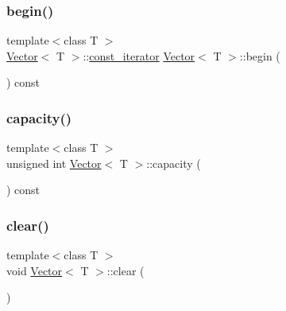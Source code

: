 \mbox{\label{classVector_af8559abeb71f43efc0fc2933b79c3901_af8559abeb71f43efc0fc2933b79c3901}} 
\subsubsection{\texorpdfstring{begin()}{begin()}\hspace{0.1cm}{\footnotesize\ttfamily [2/2]}}
{\footnotesize\ttfamily template$<$class T $>$ \\
\hyperlink{classVector}{Vector}$<$ T $>$\+::\hyperlink{classVector_1_1const__iterator}{const\+\_\+iterator} \hyperlink{classVector}{Vector}$<$ T $>$\+::begin (\begin{DoxyParamCaption}{ }\end{DoxyParamCaption}) const}

\mbox{\label{classVector_a68ecb8dc5e1047cead715396d146ed61_a68ecb8dc5e1047cead715396d146ed61}} 
\subsubsection{\texorpdfstring{capacity()}{capacity()}}
{\footnotesize\ttfamily template$<$class T $>$ \\
unsigned int \hyperlink{classVector}{Vector}$<$ T $>$\+::capacity (\begin{DoxyParamCaption}{ }\end{DoxyParamCaption}) const}

\mbox{\label{classVector_a32ad98b135472b0ebc5d6cb3ae5d0085_a32ad98b135472b0ebc5d6cb3ae5d0085}} 
\subsubsection{\texorpdfstring{clear()}{clear()}}
{\footnotesize\ttfamily template$<$class T $>$ \\
void \hyperlink{classVector}{Vector}$<$ T $>$\+::clear (\begin{DoxyParamCaption}{ }\end{DoxyParamCaption})}

